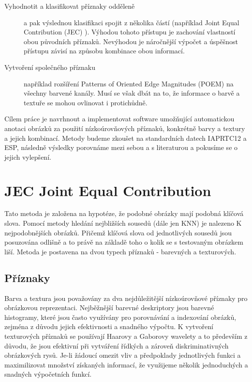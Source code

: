 \documentclass[czech,BP]{thesiskiv}
\begin{document}
\begin{description}
\item[Vyhodnotit a klasifikovat příznaky odděleně] 
a pak výslednou klasifikaci spojit z několika částí (například Joint Equal Contribution (JEC) \cite{JEC} ). Výhodou tohoto přístupu je zachování vlastností obou původních příznaků. Nevýhodou je náročnější výpočet a úspěšnost přístupu závisí na způsobu kombinace obou informací.

\item[Vytvoření společného příznaku] 
například rozšíření Patterns of Oriented Edge Magnitudes (POEM) na všechny barvené kanály. Musí se však dbát na to, že informace o barvě a textuře se mohou ovlinovat i protichůdně. 
\end{description} 

\par Cílem práce je navrhnout a implementovat software umožňující automatickou anotaci obrázků za použití nízkoúrovňových příznaků, konkrétně barvy a textury a jejich kombinací. Metody budeme zkoušet na standardních datech IAPRTC12 a ESP, následně výsledky porovnáme mezi sebou a s literaturou a pokusíme se o jejich vylepšení.

\chapter{JEC Joint Equal Contribution}
Tato metoda je založena na hypotéze, že podobné obrázky mají podobná klíčová slova. Pomocí metody hledání nejbližších sousedů (dále jen KNN) je nalezeno K nejpodobnějších obrázků. Přičemž klíčová slova od jednotlivých sousedů jsou posuzována odlišně a to právě na základě toho o kolik se s testovaným obrázkem liší. Metoda je postavena na dvou typech příznaků - barevných a texturových. 
\cite{JEC}

\section{Příznaky}
\par Barva a textura jsou považovány za dva nejdůležitější nízkoúrovňové příznaky pro obrázkovou reprezentaci. Nejběžnější barevné deskriptory jsou barevné histogramy, které jsou často využívány pro porovnávání a indexování obrázků, zejména z důvodu jejich efektivnosti a snadného výpočtu. K vytvoření texturových příznaků se používají Haarovy a Gaborovy wavelety a to především z důvodu, že jsou efektivní při vytváření řídkých a zároveň diskriminativných obrázkových rysů. Je-li žádoucí omezit vliv a předpoklady jednotlivých funkci a maximilizovat množství získaných informací, že využijeme několik jednoduchých a snadných výpočetních funkcí. 
\end{document}
